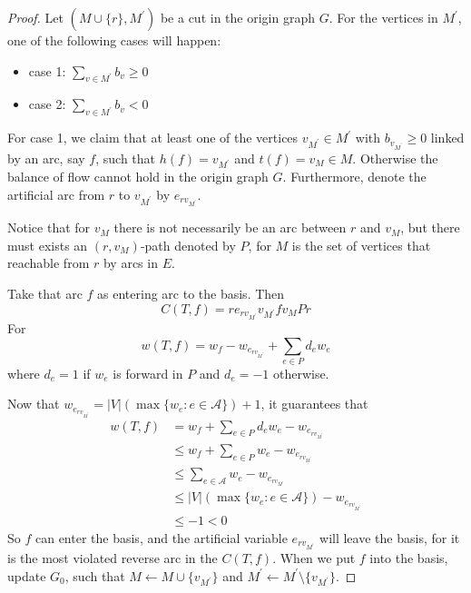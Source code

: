 \begin{proof}
                        Let $(M\cup\{r\}, M^\prime)$ be a cut in the origin graph $G$. For the vertices in $M^\prime$, one of the following cases will happen:
                        \begin{itemize}
                            \item case 1: $\sum_{v \in M^\prime} b_v \ge 0$
                            \item case 2: $\sum_{v \in M^\prime} b_v < 0$
                        \end{itemize}

                        For case 1, we claim that at least one of the vertices $v_{M^\prime} \in M^\prime$ with $b_{v_{M^\prime}} \ge 0$ linked by an arc, say $f$, such that $h(f) = v_{M^\prime}$ and $t(f) = v_M \in M$. Otherwise the balance of flow cannot hold in the origin graph $G$. Furthermore, denote the artificial arc from $r$ to $v_{M^\prime}$ by $e_{rv_{M^\prime}}$.

                        Notice that for $v_M$ there is not necessarily be an arc between $r$ and $v_M$, but there must exists an $(r, v_M)$-path denoted by $P$, for $M$ is the set of vertices that reachable from $r$ by arcs in $E$.

                        Take that arc $f$ as entering arc to the basis. Then 
                        \begin{equation*}
                            C(T, f) = re_{rv_{M^\prime}}v_{M^\prime}fv_MPr
                        \end{equation*}
                        For
                        \begin{equation*}
                            w(T, f) = w_f - w_{e_{rv_{M^\prime}}} + \sum_{e \in P} d_e w_e
                        \end{equation*}
                        where $d_e = 1$ if $w_e$ is forward in $P$ and $d_e = -1$ otherwise.

                        Now that $w_{e_{rv_{M^\prime}}} = |V|(\max\{w_e: e\in \mathcal{A}\}) + 1$, it guarantees that
                        \begin{align*}
                            w(T, f) &= w_f + \sum_{e \in P} d_e w_e - w_{e_{rv_{M^\prime}}}\\
                                    &\le w_f + \sum_{e \in P}w_e - w_{e_{rv_{M^\prime}}}\\
                                    &\le \sum_{e \in \mathcal{A}}w_e - w_{e_{rv_{M^\prime}}}\\
                                    &\le |V|(\max\{w_e: e\in \mathcal{A}\}) - w_{e_{rv_{M^\prime}}}\\
                                    &\le -1 < 0 
                        \end{align*}
                        So $f$ can enter the basis, and the artificial variable $e_{rv_{M^\prime}}$ will leave the basis, for it is the most violated reverse arc in the $C(T, f)$. When we put $f$ into the basis, update $G_0$, such that $M \leftarrow M \cup \{v_{M^\prime}\}$ and $M^\prime \leftarrow M^\prime \setminus \{v_{M^\prime}\}$.


\end{proof}
